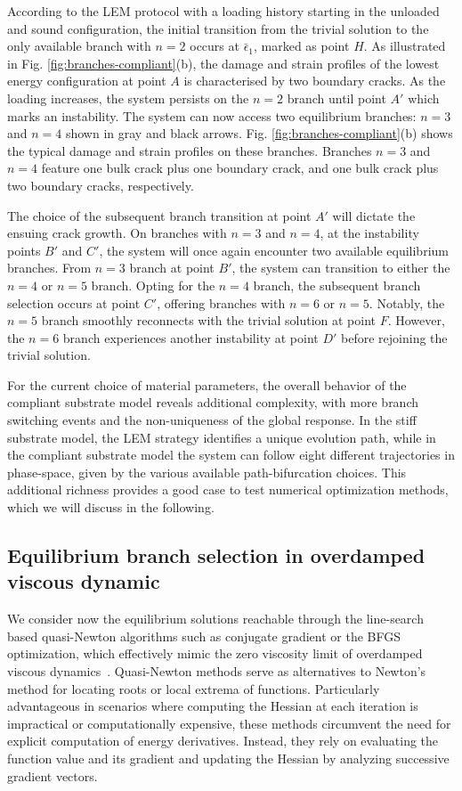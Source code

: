 \documentclass[10pt]{article}
\begin{document}
According to the LEM protocol with a loading history starting in the unloaded and sound configuration, the initial transition from the trivial solution to the only available branch with $n=2$ occurs at $\bar \epsilon_1$, marked as point $H$. As illustrated in Fig. \ref{fig:branches-compliant}(b), the damage and strain profiles of the lowest energy configuration at point $A$ is characterised by two boundary cracks. As the loading increases, the system persists on the $n=2$ branch until point $A'$ which marks an instability. The system can now access two equilibrium branches: $n=3$ and $n=4$ shown in gray and black arrows. Fig. \ref{fig:branches-compliant}(b) shows the typical damage and strain profiles on these branches. Branches $n=3$ and $n=4$ feature one bulk crack plus one boundary crack, and one bulk crack plus two boundary cracks, respectively. 

The choice of the subsequent branch transition at point $A'$ will dictate the ensuing crack growth. On branches with $n=3$ and $n=4$, at the instability points $B'$ and $C'$, the system will once again encounter two available equilibrium branches. From $n=3$ branch  at point $B'$, the system can transition to either the $n=4$ or $n=5$ branch. Opting for the $n=4$ branch, the subsequent branch selection occurs at point $C'$, offering branches with $n=6$ or $n=5$. Notably, the $n=5$ branch smoothly reconnects with the trivial solution at point $F$. However, the $n=6$ branch experiences another instability at point $D'$ before rejoining the trivial solution. 

For the current choice of material parameters, the overall behavior of the compliant substrate model reveals additional complexity, with more branch switching events and the non-uniqueness of the global response. In the stiff substrate model, the LEM strategy identifies a unique evolution path, while in the compliant substrate model the system can follow eight different trajectories in phase-space, given by the various available path-bifurcation choices. This additional richness provides a good case to test numerical optimization methods, which we will discuss in the following.

\subsection{Equilibrium branch selection in overdamped viscous dynamic}
We consider now the equilibrium solutions reachable through the line-search based quasi-Newton algorithms such as  conjugate gradient or the BFGS optimization, which effectively  mimic the zero viscosity limit of overdamped viscous dynamics~\cite{SALMAN2012219}. Quasi-Newton methods serve as alternatives to Newton's method for locating roots or local extrema of functions. Particularly advantageous in scenarios where computing the Hessian at each iteration is impractical or computationally expensive, these methods circumvent the need for explicit computation of energy derivatives. Instead, they rely on evaluating the function value and its gradient and updating the Hessian by analyzing successive gradient vectors.
\end{document}
